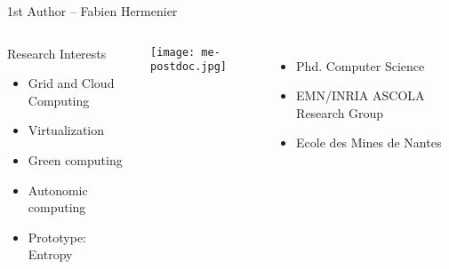 \begin{frame} {1st Author -- Fabien Hermenier}
\begin{columns}[t]%


\begin{block}{Research Interests}
\begin{itemize}
\item<1-> Grid and Cloud Computing
\item<2-> Virtualization
\item<3-> Green computing
\item<4-> Autonomic computing
\item<5-> Prototype: Entropy
\end{itemize}
\end{block}


\texttt{[image: me-postdoc.jpg]} 
\begin{itemize}
\item Phd. Computer Science 
\item EMN/INRIA ASCOLA Research Group 
\item Ecole des Mines de Nantes
\end{itemize}
\end{columns}%

\end{frame}


